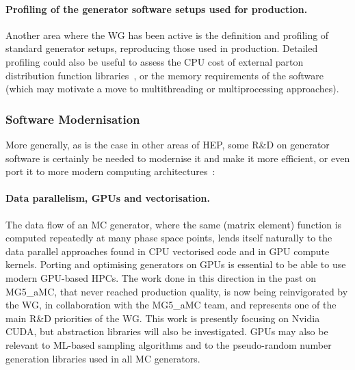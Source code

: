 \paragraph{Profiling of the generator software setups used for production.}
Another area where the WG has been active is the definition and
profiling of standard generator setups, reproducing those used in
production. Detailed profiling could also be useful to assess the CPU
cost of external parton distribution function libraries~\cite{Kon20}, or
the memory requirements of the software (which may motivate a move to
multithreading or multiprocessing approaches).

\subsubsection{Software Modernisation}

More generally, as is the case in other areas of HEP, some R\&D on
generator software is certainly be needed to modernise it and make it
more efficient, or even port it to more modern computing 
architectures~\cite{Bau13,Alves:2017she}:

\paragraph{Data parallelism, GPUs and vectorisation.} The data flow of an MC
generator, where the same (matrix element) function is computed
repeatedly at many phase space points, lends itself naturally to the
data parallel approaches found in CPU vectorised code and in GPU compute
kernels. Porting and optimising generators on GPUs is essential to be
able to use modern GPU-based HPCs. The work done in this direction in
the past on MG5\_aMC, that never reached production quality, is now
being reinvigorated by the WG, in collaboration with the MG5\_aMC team, and
represents one of the main R\&D priorities of the WG. This work is
presently focusing on Nvidia CUDA, but abstraction libraries will also
be investigated. GPUs may also be relevant to ML-based sampling
algorithms and to the pseudo-random number generation libraries used in
all MC generators.

